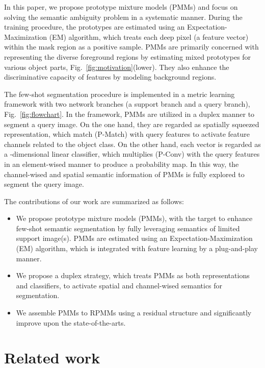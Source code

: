 \documentclass[runningheads]{llncs}
\begin{document}
In this paper, we propose prototype mixture models (PMMs) and focus on solving the semantic ambiguity problem in a systematic manner.
During the training procedure, the prototypes are estimated using an Expectation-Maximization (EM) algorithm, which treats each deep pixel (a feature vector) within the mask region as a positive sample.  
PMMs are primarily concerned with representing the diverse foreground regions by estimating mixed prototypes for various object parts, Fig.\ \ref{fig:motivation}(lower). They also enhance the discriminative capacity of features by modeling background regions.

The few-shot segmentation procedure is implemented in a metric learning framework with two network branches (a support branch and a query branch), Fig.\ \ref{fig:flowchart}. In the framework, PMMs are utilized in a duplex manner to segment a query image. 
On the one hand, they are regarded as spatially squeezed representation, which match (P-Match) with query features to activate feature channels related to the object class. On the other hand, each vector is regarded as a -dimensional linear classifier, which multiplies (P-Conv) with the query features in an element-wised manner to produce a probability map. In this way, the channel-wised and spatial semantic information of PMMs is fully explored to segment the query image.

The contributions of our work are summarized as follows:
\begin{itemize}
    \item We propose prototype mixture models (PMMs), with the target to enhance few-shot semantic segmentation by fully leveraging semantics of limited support image(s). PMMs are estimated using an Expectation-Maximization (EM) algorithm, which is integrated with feature learning by a plug-and-play manner. 
    
    \item We propose a duplex strategy, which treats PMMs as both representations and classifiers, to activate spatial and channel-wised semantics for segmentation. 
    
    \item We assemble PMMs to RPMMs using a residual structure and significantly improve upon the state-of-the-arts.
\end{itemize}

\section{Related work}
\end{document}

